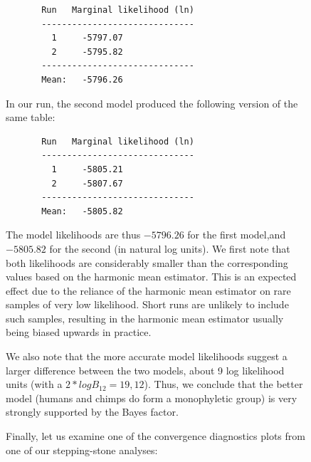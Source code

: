 \documentclass[12pt]{book}
\begin{document}
\begin{figure}[h]
\begin{singlespacing}
\begin{verbatim}
       Run   Marginal likelihood (ln)
       ------------------------------
         1     -5797.07   
         2     -5795.82   
       ------------------------------
       Mean:   -5796.26
\end{verbatim}
\end{singlespacing}
\normalsize

In our run, the second model produced the following version of the same table:

\scriptsize
\begin{singlespacing}
\begin{verbatim}
       Run   Marginal likelihood (ln)
       ------------------------------
         1     -5805.21   
         2     -5807.67   
       ------------------------------
       Mean:   -5805.82
\end{verbatim}
\end{singlespacing}
\normalsize

The model likelihoods are thus $-5796.26$ for the first model,and $-5805.82$ for the second (in
natural log units). We first note that both likelihoods are considerably smaller than the
corresponding values based on the harmonic mean estimator. This is an expected effect due to the
reliance of the harmonic mean estimator on rare samples of very low likelihood. Short runs are
unlikely to include such samples, resulting in the harmonic mean estimator usually being biased
upwards in practice.

We also note that the more accurate model likelihoods suggest a larger difference between the two
models, about 9 log likelihood units (with a $2*logB_{12} = 19,12$). Thus, we conclude that the
better model (humans and chimps do form a monophyletic group) is very strongly supported by the
Bayes factor.

Finally, let us examine one of the convergence diagnostics plots from one of our stepping-stone
analyses:


\end{figure}
\end{document}
